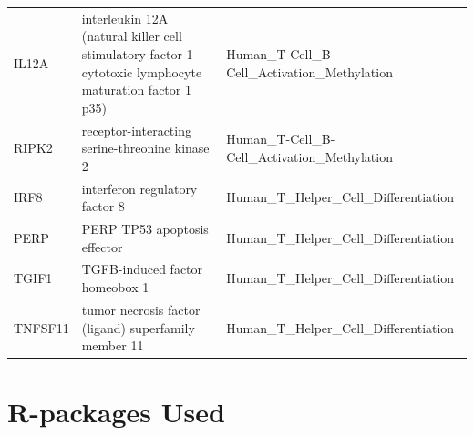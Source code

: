 \documentclass[11pt]{article}
\begin{document}
\begin{table}[H]
{\begin{tabular}{|l|l|l|}
IL12A         & interleukin 12A (natural killer cell stimulatory factor 1  cytotoxic lymphocyte maturation factor 1  p35) & Human\_T-Cell\_B-Cell\_Activation\_Methylation             \\ 
RIPK2         & receptor-interacting serine-threonine kinase 2                                                            & Human\_T-Cell\_B-Cell\_Activation\_Methylation             \\ 
IRF8          & interferon regulatory factor 8                                                                            & Human\_T\_Helper\_Cell\_Differentiation                    \\ 
PERP          & PERP  TP53 apoptosis effector                                                                             & Human\_T\_Helper\_Cell\_Differentiation                    \\ 
TGIF1         & TGFB-induced factor homeobox 1                                                                            & Human\_T\_Helper\_Cell\_Differentiation                    \\ 
TNFSF11       & tumor necrosis factor (ligand) superfamily  member 11                                                     & Human\_T\_Helper\_Cell\_Differentiation                    \\ \hline
\end{tabular}}
\end{table}






\section*{R-packages Used}
\end{document}

